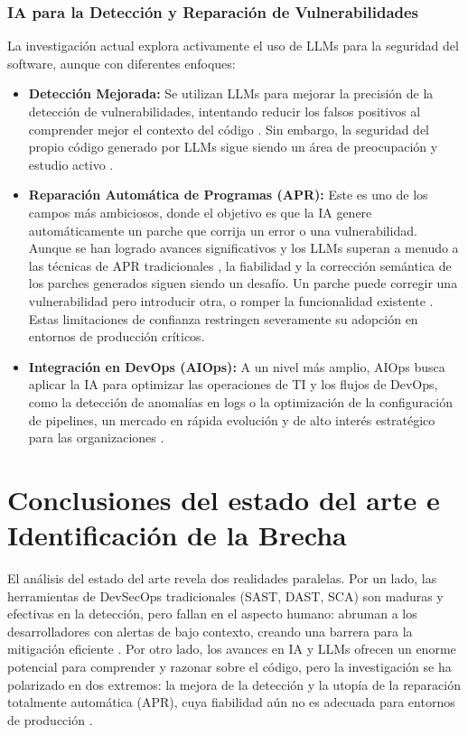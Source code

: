 \subsubsection{IA para la Detección y Reparación de Vulnerabilidades}
La investigación actual explora activamente el uso de LLMs para la seguridad del software, aunque con diferentes enfoques:
\begin{itemize}
    \item \textbf{Detección Mejorada:} Se utilizan LLMs para mejorar la precisión de la detección de vulnerabilidades, intentando reducir los falsos positivos al comprender mejor el contexto del código \cite{GitHubAICodeReviews}. Sin embargo, la seguridad del propio código generado por LLMs sigue siendo un área de preocupación y estudio activo \cite{GitGuardian2024CopilotConcerns}.
    
    \item \textbf{Reparación Automática de Programas (APR):} Este es uno de los campos más ambiciosos, donde el objetivo es que la IA genere automáticamente un parche que corrija un error o una vulnerabilidad. Aunque se han logrado avances significativos y los LLMs superan a menudo a las técnicas de APR tradicionales \cite{Liu2024APRSurvey}, la fiabilidad y la corrección semántica de los parches generados siguen siendo un desafío. Un parche puede corregir una vulnerabilidad pero introducir otra, o romper la funcionalidad existente \cite{Fu2023Patching}. Estas limitaciones de confianza restringen severamente su adopción en entornos de producción críticos.
    
    \item \textbf{Integración en DevOps (AIOps):} A un nivel más amplio, AIOps busca aplicar la IA para optimizar las operaciones de TI y los flujos de DevOps, como la detección de anomalías en logs o la optimización de la configuración de pipelines, un mercado en rápida evolución y de alto interés estratégico para las organizaciones \cite{Gartner2023AIOpsGuide}.
\end{itemize}

\section{Conclusiones del estado del arte e Identificación de la Brecha}\label{sec:conclusionesSOTA}
El análisis del estado del arte revela dos realidades paralelas. Por un lado, las herramientas de DevSecOps tradicionales (SAST, DAST, SCA) son maduras y efectivas en la detección, pero fallan en el aspecto humano: abruman a los desarrolladores con alertas de bajo contexto, creando una barrera para la mitigación eficiente \cite{Johnson2023UsabilitySAST}. Por otro lado, los avances en IA y LLMs ofrecen un enorme potencial para comprender y razonar sobre el código, pero la investigación se ha polarizado en dos extremos: la mejora de la detección y la utopía de la reparación totalmente automática (APR), cuya fiabilidad aún no es adecuada para entornos de producción \cite{Liu2024APRSurvey}.

